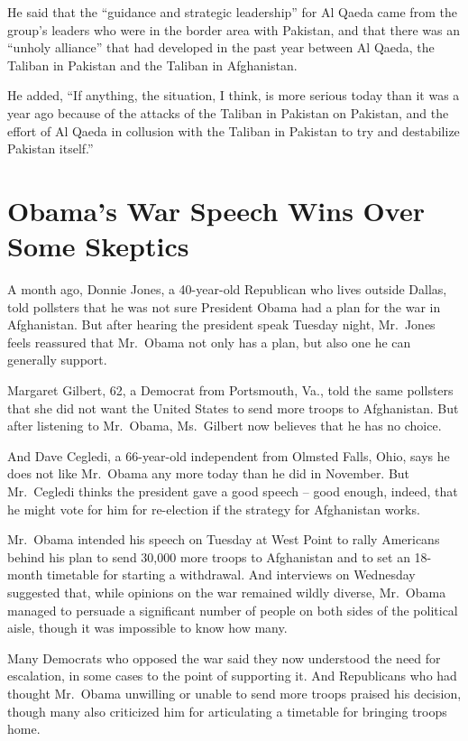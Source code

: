 ﻿\documentclass[12pt]{article}
\begin{document}
He said that the ``guidance and strategic leadership'' for Al Qaeda came from the group's leaders
who were in the border area with Pakistan, and that there was an ``unholy alliance'' that had
developed in the past year between Al Qaeda, the Taliban in Pakistan and the Taliban in Afghanistan.

He added, ``If anything, the situation, I think, is more serious today than it was a year ago
because of the attacks of the Taliban in Pakistan on Pakistan, and the effort of Al Qaeda in
collusion with the Taliban in Pakistan to try and destabilize Pakistan itself.''

\section{Obama's War Speech Wins Over Some Skeptics}

\lettrine{A}{} month ago, Donnie Jones, a 40-year-old Republican who lives
outside Dallas, told pollsters that he was not sure President Obama had a plan for the war in
Afghanistan. But after hearing the president speak Tuesday night, Mr.~Jones feels reassured that
Mr.~Obama not only has a plan, but also one he can generally support.

Margaret Gilbert, 62, a Democrat from Portsmouth, Va., told the same pollsters that she did not want
the United States to send more troops to Afghanistan. But after listening to Mr.~Obama, Ms.~Gilbert
now believes that he has no choice.

And Dave Cegledi, a 66-year-old independent from Olmsted Falls, Ohio, says he does not like
Mr.~Obama any more today than he did in November. But Mr.~Cegledi thinks the president gave a good
speech -- good enough, indeed, that he might vote for him for re-election if the strategy for
Afghanistan works.

Mr.~Obama intended his speech on Tuesday at West Point to rally Americans behind his plan to send
30,000 more troops to Afghanistan and to set an 18-month timetable for starting a withdrawal. And
interviews on Wednesday suggested that, while opinions on the war remained wildly diverse, Mr.~Obama
managed to persuade a significant number of people on both sides of the political aisle, though it
was impossible to know how many.

Many Democrats who opposed the war said they now understood the need for escalation, in some cases
to the point of supporting it. And Republicans who had thought Mr.~Obama unwilling or unable to send
more troops praised his decision, though many also criticized him for articulating a timetable for
bringing troops home.
\end{document}
